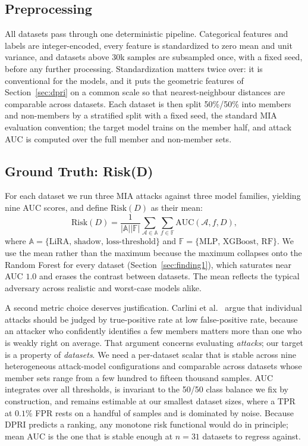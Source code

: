 \subsection{Preprocessing}

All datasets pass through one deterministic pipeline. Categorical
features and labels are integer-encoded, every feature is standardized
to zero mean and unit variance, and datasets above 30k samples are
subsampled once, with a fixed seed, before any further processing.
Standardization matters twice over: it is conventional for the models,
and it puts the geometric features of Section~\ref{sec:dpri} on a
common scale so that nearest-neighbour distances are comparable across
datasets. Each dataset is then split 50\%/50\% into members and
non-members by a stratified split with a fixed seed, the standard MIA
evaluation convention; the target model trains on the member half, and
attack AUC is computed over the full member and non-member sets.

\subsection{Ground Truth: Risk(D)}

For each dataset we run three MIA attacks against three model families,
yielding nine AUC scores, and define $\mathrm{Risk}(D)$ as their mean:
\begin{equation}
  \mathrm{Risk}(D) = \frac{1}{|\mathbb{A}||\mathbb{F}|}
  \sum_{\mathcal{A} \in \mathbb{A}} \sum_{f \in \mathbb{F}}
  \mathrm{AUC}(\mathcal{A}, f, D),
  \label{eq:risk_gt}
\end{equation}
where $\mathbb{A} = \{\text{LiRA, shadow, loss-threshold}\}$ and
$\mathbb{F} = \{\text{MLP, XGBoost, RF}\}$.
We use the mean rather than the maximum because the maximum collapses onto
the Random Forest for every dataset (Section~\ref{sec:finding1}), which
saturates near AUC $1.0$ and erases the contrast between datasets. The mean
reflects the typical adversary across realistic and worst-case models alike.

A second metric choice deserves justification. Carlini et
al.~\cite{carlini2022lira} argue that individual attacks should be
judged by true-positive rate at low false-positive rate, because an
attacker who confidently identifies a few members matters more than one
who is weakly right on average. That argument concerns evaluating
\emph{attacks}; our target is a property of \emph{datasets}. We need a
per-dataset scalar that is stable across nine heterogeneous
attack-model configurations and comparable across datasets whose member
sets range from a few hundred to fifteen thousand samples. AUC
integrates over all thresholds, is invariant to the 50/50 class balance
we fix by construction, and remains estimable at our smallest dataset
sizes, where a TPR at $0.1\%$ FPR rests on a handful of samples and is
dominated by noise. Because DPRI predicts a ranking, any monotone risk
functional would do in principle; mean AUC is the one that is stable
enough at $n = 31$ datasets to regress against.

